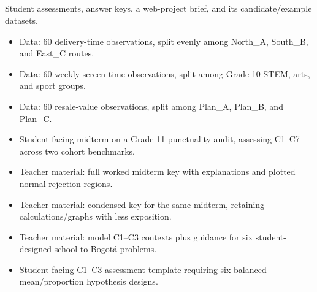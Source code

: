 \subsection{}

Student assessments, answer keys, a web-project brief, and its candidate/example datasets.

\begin{itemize}
  \item {}

  Data: 60 delivery-time observations, split evenly among North\_A, South\_B, and East\_C routes.

  \item {}

  Data: 60 weekly screen-time observations, split among Grade 10 STEM, arts, and sport groups.

  \item {}

  Data: 60 resale-value observations, split among Plan\_A, Plan\_B, and Plan\_C.

  \item {}

  Student-facing midterm on a Grade 11 punctuality audit, assessing C1–C7 across two cohort benchmarks.

  \item {}

  Teacher material: full worked midterm key with explanations and plotted normal rejection regions.

  \item {}

  Teacher material: condensed key for the same midterm, retaining calculations/graphs with less exposition.

  \item {}

  Teacher material: model C1–C3 contexts plus guidance for six student-designed school-to-Bogotá problems.

  \item {}

  Student-facing C1–C3 assessment template requiring six balanced mean/proportion hypothesis designs.


\end{itemize}
